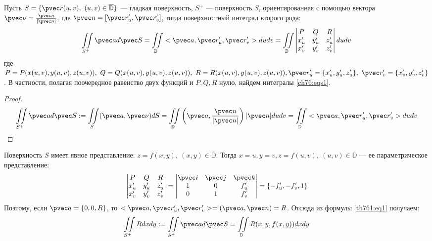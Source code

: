 \begin{theorem}
  Пусть $S = \{\pvec r(u, v), \ (u, v) \in \overline{\mathbb{D}}\}$ --- гладкая
  поверхность, $S^+$ --- поверхность $S$, ориентированная с помощью вектора
  $\pvec \nu = \frac{\pvec n}{|\pvec n|}$, где $\pvec n = [\pvec r_u', \pvec
  r_v']$, тогда поверхностный интеграл второго рода:
  \begin{gather}
    \iint\limits_{S^+} \pvec a d \pvec S = \iint\limits_{\mathbb{D}} <\pvec a,
    \pvec r_u', \pvec r_v'> du dv = \iint\limits_{\mathbb{D}}
    \begin{vmatrix}
      P & Q & R \\
      x_u' & y_u' & z_u' \\
      x_v' & y_v' & z_v'
    \end{vmatrix}
    du dv
    \label{th761:eq1}
  \end{gather}
  где $P = P(x(u, v), y(u, v), z(u, v)), \ Q = Q(x(u, v), y(u, v), z(u,v)), \ R =
  R(x(u, v), y(u, v), z(u,v)), \\ \pvec r_u' = \{x_u', y_u', z_u'\}, \ \pvec r_v' =
  \{x_v', y_v', z_v'\}$. В частности, полагая поочередное равенство двух
  функций и $P, Q, R$ нулю, найдем интегралы \eqref{ch76:eqs1}.
\end{theorem}

\begin{proof}
  \begin{gather*}
    \iint\limits_{S^+} \pvec a d \pvec S := \iint\limits_S (\pvec a, \pvec \nu)
    dS = \iint\limits_{\mathbb{D}} \left(\pvec a, \frac{\pvec n}{|\pvec n|}
    \right) |\pvec n| du dv = \iint\limits_{\mathbb{D}} <\pvec a, \pvec r_u',
    \pvec r_v'> du dv
  \end{gather*}
\end{proof}

\begin{example}
  \label{ex761}
  Поверхность $S$ имеет явное представление: $z = f(x, y), \ (x, y) \in
  \overline{\mathbb{D}}$. Тогда $x = u, y = v, z = f(u, v), \ (u, v) \in
  \overline{\mathbb{D}}$ --- ее параметрическое представление:
  \begin{gather*}
    \begin{vmatrix}
      P & Q & R \\
      x_u' & y_u' & z_u' \\
      x_v' & y_v' & z_v'
    \end{vmatrix} =
    \begin{vmatrix}
      \pvec i & \pvec j & \pvec k \\
      1 & 0 & f_u' \\
      0 & 1 & f_v'
    \end{vmatrix} =
    \{-f_u', -f_v', 1\}
    \label{ex761:eq1}
  \end{gather*}
  Поэтому, если $\pvec a = \{0, 0, R\}$, то $<\pvec a, \pvec r_u', \pvec r_v'>
  = (\pvec a, \pvec n) = R$. Отсюда из формулы \eqref{th761:eq1} получаем:
  \begin{gather}
    \iint\limits_{S^+} R dx dy := \iint\limits_{S^+} \pvec a d \pvec S =
    \iint\limits_{\mathbb{D}} R(x, y, f(x, y)) dx dy
    \label{ex761:eq2}
  \end{gather}
\end{example}


